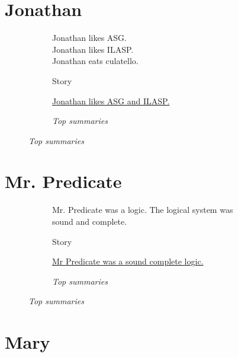 \section{Jonathan}

\begin{figure}[H]
\begin{subfigure}{0.45\textwidth}
\begin{displayquote}
Jonathan likes ASG.\\
Jonathan likes ILASP.\\
Jonathan eats culatello.
\end{displayquote}
\caption{Story}
\end{subfigure}
\begin{subfigure}{0.55\textwidth}
\begin{displayquote}
\item \ul{Jonathan likes ASG and ILASP.}
\end{displayquote}
\caption{\textit{Top summaries}}
\end{subfigure}
\end{figure}

\section{Mr. Predicate}

\begin{figure}[H]
\begin{subfigure}{\textwidth}
\begin{displayquote}
Mr. Predicate was a logic. The logical system was sound and complete.
\end{displayquote}
\caption{Story}
\vspace{\baselineskip}
\end{subfigure}
\begin{subfigure}{\textwidth}
\begin{displayquote}
\item \ul{Mr Predicate was a sound complete logic.}
\end{displayquote}
\caption{\textit{Top summaries}}
\end{subfigure}
\end{figure}

\section{Mary}

